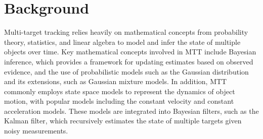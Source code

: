 \chapter{Background}
Multi-target tracking relies heavily on mathematical concepts from probability theory, statistics, and linear algebra to model and infer the state of multiple objects over time. Key mathematical concepts involved in MTT include Bayesian inference, which provides a framework for updating estimates based on observed evidence, and the use of probabilistic models such as the Gaussian distribution and its extensions, such as Gaussian mixture models. In addition, MTT commonly employs state space models to represent the dynamics of object motion, with popular models including the constant velocity and constant acceleration models. These models are integrated into Bayesian filters, such as the Kalman filter, which recursively estimates the state of multiple targets given noisy measurements. 
